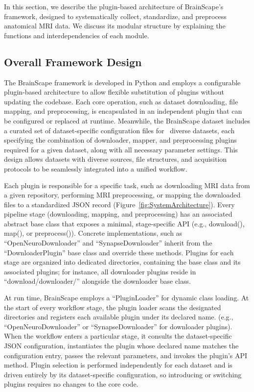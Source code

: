In this section, we describe the plugin-based architecture of BrainScape's framework, designed to systematically 
collect, standardize, and preprocess anatomical MRI data. We discuss its modular structure by explaining 
the functions and interdependencies of each module.

\subsection{Overall Framework Design}

The BrainScape framework is developed in Python and employs a configurable plugin-based architecture to allow flexible 
substitution of plugins without updating the codebase. 
Each core operation, such as dataset downloading, file mapping, and preprocessing, is encapsulated in an independent plugin that can be configured or replaced at runtime.
Meanwhile, the BrainScape dataset includes a curated set of dataset-specific configuration files for \NumDatasets\ diverse datasets, 
each specifying the combination of downloader, mapper, and preprocessing plugins required for a given dataset, along with all necessary parameter settings.
This design allows datasets with diverse sources, file structures, and acquisition protocols to be seamlessly integrated into a unified workflow.

Each plugin is responsible for a specific task, such as downloading MRI data from a given repository, 
performing MRI preprocessing, or mapping the downloaded files to a standardized JSON record (Figure~\ref{fig:SystemArchitecture}).
Every pipeline stage (downloading, mapping, and preprocessing) has an associated abstract base class that exposes a minimal, stage-specific API 
(e.g., download(), map(), or preprocess()).
Concrete implementations, such as ``OpenNeuroDownloader'' and ``SynapseDownloader'' inherit from the ``DownloaderPlugin'' base class and override these methods. 
Plugins for each stage are organized into dedicated directories, containing the base class and its associated plugins; 
for instance, all downloader plugins reside in ``download/downloader/'' alongside the downloader base class.

At run time, BrainScape employs a ``PluginLoader'' for dynamic class loading.
At the start of every workflow stage, the plugin loader scans the designated directories 
and registers each available plugin under its declared name.
(e.g., ``OpenNeuroDownloader'' or ``SynapseDownloader'' for downloader plugins).
When the workflow enters a particular stage, it consults the dataset-specific JSON configuration, 
instantiates the plugin whose declared name matches the configuration entry, passes the relevant parameters, 
and invokes the plugin's API method. 
Plugin selection is performed independently for each dataset 
and is driven entirely by its dataset-specific configuration, 
so introducing or switching plugins requires no changes to the core code.

